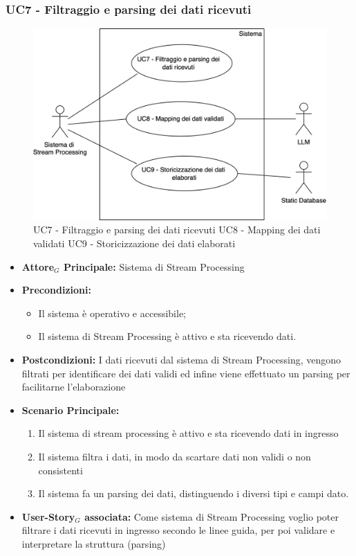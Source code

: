 \documentclass[11pt]{article}
\begin{document}
\begin{justify}
\subsubsection{\textbf{UC7 - Filtraggio e parsing dei dati ricevuti}}
\begin{figure}[H]
    \centering
    \includegraphics[width=0.7\linewidth]{UC789image.png}
    \caption{UC7 - Filtraggio e parsing dei dati ricevuti \newline UC8 - Mapping dei dati validati
    \newline UC9 - Storicizzazione dei dati elaborati}
    \label{fig:UC789}
\end{figure}
\label{UC7}
\begin{itemize}
    \item \textbf{Attore$_G$ Principale:} Sistema di Stream Processing
    \item \textbf{Precondizioni:} 
        \begin{itemize}
          \item Il sistema è operativo e accessibile;
            \item Il sistema di Stream Processing è attivo e sta ricevendo dati.
        \end{itemize}
      \item \textbf{Postcondizioni:} I dati ricevuti dal sistema di Stream Processing, vengono filtrati per identificare dei dati validi ed infine viene effettuato un parsing per facilitarne l'elaborazione\\
    \item \textbf{Scenario Principale:} 
        \begin{enumerate}
        \item Il sistema di stream processing è attivo e sta ricevendo dati in ingresso
        \item Il sistema filtra i dati, in modo da scartare dati non validi o non consistenti
        \item Il sistema fa un parsing dei dati, distinguendo i diversi tipi e campi dato.
        \end{enumerate}
    \item \textbf{User-Story$_G$ associata:} Come sistema di Stream Processing voglio poter filtrare i dati ricevuti in ingresso secondo le linee guida, per poi validare e interpretare la struttura (parsing)
\end{itemize}



\end{justify}
\end{document}
